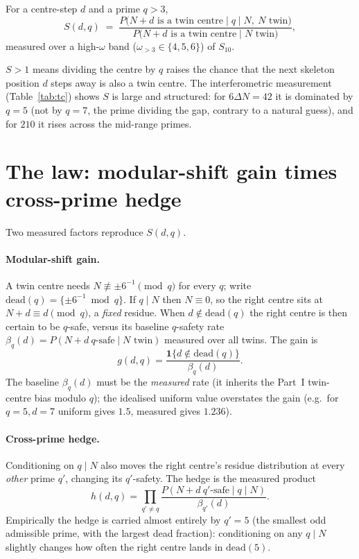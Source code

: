 \documentclass[11pt]{article}
\begin{document}
\begin{definition}
For a centre-step $d$ and a prime $q>3$,
\[
  S(d,q)\;=\;\frac{P\big(N{+}d\text{ is a twin centre}\mid q\mid N,\ N\text{ twin}\big)}
                   {P\big(N{+}d\text{ is a twin centre}\mid N\text{ twin}\big)},
\]
measured over a high-$\omega$ band ($\omega_{>3}\in\{4,5,6\}$) of $S_{10}$.
\end{definition}

$S>1$ means dividing the centre by $q$ raises the chance that the next skeleton
position $d$ steps away is also a twin centre. The interferometric measurement
(Table~\ref{tab:tc}) shows $S$ is large and structured: for $6\Delta N=42$ it is
dominated by $q=5$ (not by $q=7$, the prime dividing the gap, contrary to a
natural guess), and for $210$ it rises across the mid-range primes.

\section{The law: modular-shift gain times cross-prime hedge}

Two measured factors reproduce $S(d,q)$.

\paragraph{Modular-shift gain.}
A twin centre needs $N\not\equiv\pm6^{-1}\pmod q$ for every $q$; write
$\mathrm{dead}(q)=\{\pm6^{-1}\bmod q\}$. If $q\mid N$ then $N\equiv0$, so the
right centre sits at $N+d\equiv d\pmod q$, a \emph{fixed} residue. When
$d\notin\mathrm{dead}(q)$ the right centre is then certain to be $q$-safe, versus
its baseline $q$-safety rate $\beta_q(d)=P(N{+}d\ q\text{-safe}\mid N\text{ twin})$
measured over all twins. The gain is
\[
  g(d,q)=\frac{\mathbf 1\{d\notin\mathrm{dead}(q)\}}{\beta_q(d)} .
\]
The baseline $\beta_q(d)$ must be the \emph{measured} rate (it inherits the
Part~I twin-centre bias modulo $q$); the idealised uniform value overstates the
gain (e.g.\ for $q=5,d=7$ uniform gives $1.5$, measured gives $1.236$).

\paragraph{Cross-prime hedge.}
Conditioning on $q\mid N$ also moves the right centre's residue distribution at
every \emph{other} prime $q'$, changing its $q'$-safety. The hedge is the
measured product
\[
  h(d,q)=\prod_{q'\neq q}\frac{P(N{+}d\ q'\text{-safe}\mid q\mid N)}{\beta_{q'}(d)} .
\]
Empirically the hedge is carried almost entirely by $q'=5$ (the smallest odd
admissible prime, with the largest dead fraction): conditioning on any $q\mid N$
slightly changes how often the right centre lands in $\mathrm{dead}(5)$.
\end{document}
